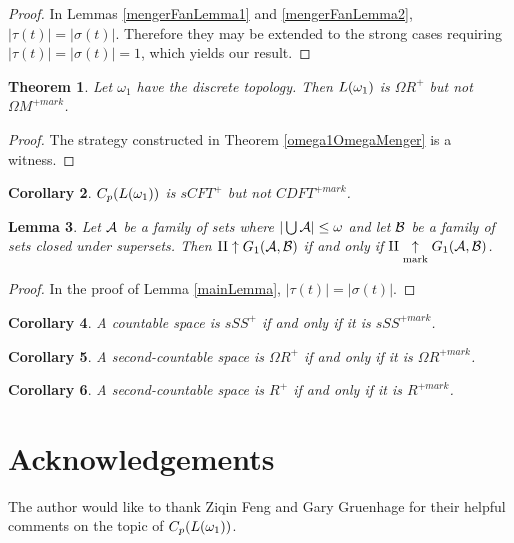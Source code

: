 \documentclass{amsart}
\theoremstyle{plain}
\newtheorem{theorem}{Theorem}
\newtheorem{lemma}[theorem]{Lemma}
\newtheorem{corollary}[theorem]{Corollary}
\theoremstyle{definition}
\theoremstyle{remark}
\theoremstyle{plain}
\theoremstyle{definition}
\theoremstyle{remark}
\begin{document}
\begin{proof}
  In Lemmas \ref{mengerFanLemma1} and \ref{mengerFanLemma2},
  \(|\tau(t)|=|\sigma(t)|\). Therefore they may be extended to
  the strong cases requiring \(|\tau(t)|=|\sigma(t)|=1\),
  which yields our result.
\end{proof}

\begin{theorem}
  Let \(\omega_1\) have the discrete topology. Then
  \(L(\omega_1)\) is \(\Omega R^+\) but not \(\Omega M^{+mark}\).
\end{theorem}

\begin{proof}
  The strategy constructed in Theorem \ref{omega1OmegaMenger} is a witness.
\end{proof}

\begin{corollary}
  \(C_p(L(\omega_1))\) is \(sCFT^+\) but not \(CDFT^{+mark}\).
\end{corollary}

\begin{lemma}
  Let \(\mathcal{A}\) be a family of sets where
  \(|\bigcup\mathcal{A}|\leq\omega\)
  and let \(\mathcal{B}\) be a family of sets closed under supersets. Then
  \(\mathrm{II}\uparrow G_{1}(\mathcal{A},\mathcal{B})\) if and only if
  \(\mathrm{II}\underset{\text{mark}}{\uparrow}G_{1}(\mathcal{A},\mathcal{B})\).
\end{lemma}

\begin{proof}
  In the proof of Lemma \ref{mainLemma}, \(|\tau(t)|=|\sigma(t)|\).
\end{proof}

\begin{corollary}
  A countable space is \(sSS^+\) if and only if it is
  \(sSS^{+mark}\).
\end{corollary}

\begin{corollary}
  A second-countable space is \(\Omega R^+\) if and only if
  it is \(\Omega R^{+mark}\).
\end{corollary}

\begin{corollary}
  A second-countable space is \(R^+\) if and only if
  it is \(R^{+mark}\).
\end{corollary}

\section{Acknowledgements}
The author would like to thank Ziqin Feng and Gary Gruenhage
for their helpful comments on the topic of \(C_p(L(\omega_1))\).



\end{document}
